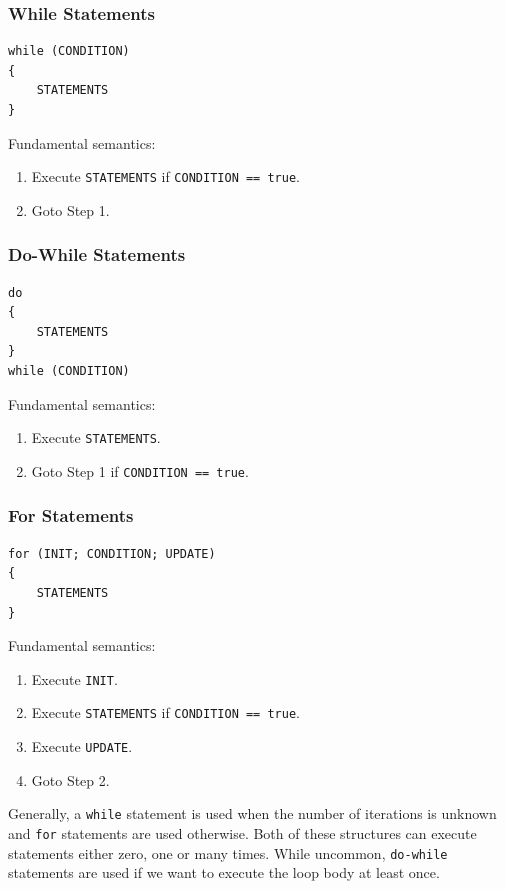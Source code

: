 \documentclass{article}
\begin{document}
\subsubsection{While Statements}
\begin{verbatim}
while (CONDITION)
{
    STATEMENTS
}
\end{verbatim}
Fundamental semantics:
\begin{enumerate}
    \item Execute \texttt{STATEMENTS} if
          \texttt{CONDITION == true}. %
    \item Goto Step 1.
\end{enumerate}
\subsubsection{Do-While Statements}
\begin{verbatim}
do
{
    STATEMENTS
}
while (CONDITION)
\end{verbatim}
Fundamental semantics:
\begin{enumerate}
    \item Execute \texttt{STATEMENTS}. %
    \item Goto Step 1 if \texttt{CONDITION == true}.
\end{enumerate}
\subsubsection{For Statements}
\begin{verbatim}
for (INIT; CONDITION; UPDATE)
{
    STATEMENTS
}
\end{verbatim}
Fundamental semantics:
\begin{enumerate}
    \item Execute \texttt{INIT}. %
    \item Execute \texttt{STATEMENTS} if
          \texttt{CONDITION == true}. %
    \item Execute \texttt{UPDATE}.
    \item Goto Step 2.
\end{enumerate}
Generally, a \texttt{while} statement is used when the number of iterations is unknown and
\texttt{for} statements are used otherwise. Both of these structures can execute
statements either zero, one or many times.
While uncommon, \texttt{do-while} statements are used if we want to
execute the loop body at least once.
\end{document}
